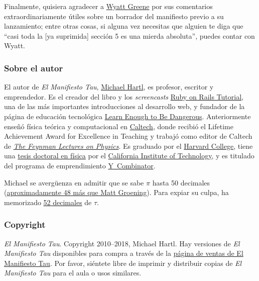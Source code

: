 Finalmente, quisiera agradecer a \href{http://techiferous.com/about}{Wyatt Greene} por sus comentarios extraordinariamente útiles sobre un borrador del manifiesto previo a su lanzamiento; entre otras cosas, si alguna vez necesitas que alguien te diga que ``casi toda la [ya suprimida] sección 5 es una mierda absoluta'', puedes contar con Wyatt.



    \subsubsection{Sobre el autor} %
    \label{sec:about_the_author}


El autor de \emph{El Manifiesto Tau}, \href{http://www.michaelhartl.com/}{Michael Hartl}, es profesor, escritor y emprendedor. Es el creador del libro y los \textit{screencasts}
\href{http://www.railstutorial.org/}{Ruby on Rails Tutorial}, una de las más importantes introducciones al desarrollo web, y fundador de la página de educación tecnológica \href{http://learnenough.com/}{Learn Enough to Be Dangerous}. Anteriormente enseñó física teórica y computacional en \href{http://www.caltech.edu/}{Caltech}, donde recibió el Lifetime Achievement Award for Excellence in Teaching y trabajó como editor de Caltech de \href{http://www.feynmanlectures.caltech.edu/}{\emph{The Feynman Lectures on Physics}}. Es graduado por el \href{http://college.harvard.edu/}{Harvard College}, tiene una \href{http://thesis.library.caltech.edu/1940/}{tesis doctoral en física} por el \href{http://www.caltech.edu/}{California Institute of Technology}, y es titulado del programa de emprendimiento \href{http://ycombinator.com/}{Y~Combinator}.

Michael se avergüenza en admitir que se sabe $\pi$ hasta 50 decimales (\href{\#fig-futurama_video}{aproximadamente 48 más que Matt Groening}). Para expiar su culpa, ha memorizado \href{http://www.wolframalpha.com/input/?i=N[2+Pi,+53]}{52 decimales} de $\tau$.

    \subsubsection{Copyright} %
    \label{sec:copyright_and_license}

    \emph{El Manifiesto Tau}. Copyright 2010--2018, Michael Hartl. Hay versiones de \emph{El Manifiesto Tau} disponibles para compra a través de la \href{http://sales.tauday.com/}{página de ventas de El Manifiesto Tau}. Por favor, siéntete libre de imprimir y distribuir copias de \emph{El Manifiesto Tau} para el aula o usos similares.

